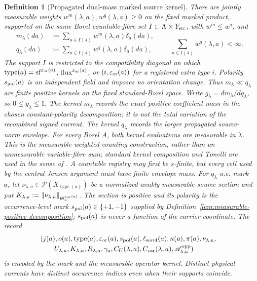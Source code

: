 \documentclass[11pt]{article}
\newtheorem{definition}[theorem]{Definition}
\begin{document}
\begin{definition}[Propagated dual-mass marked source kernel]
There are jointly measurable
weights $w^m(\lambda,a),w^q(\lambda,a)\ge0$ on the fixed marked product,
supported on the same Borel countable-fibre set
$I\subset\Lambda\times Y_{\rm src}$, with $w^m\le w^q$, and
\begin{equation}
\label{eq:marked-weighted-counting-kernel}
 \begin{aligned}
 m_\lambda(da)&:=\sum_{a\in I(\lambda)}w^m(\lambda,a)\delta_a(da),\\
 q_\lambda(da)&:=\sum_{a\in I(\lambda)}w^q(\lambda,a)\delta_a(da),
 \end{aligned}
 \qquad
 \sum_{a\in I(\lambda)}w^q(\lambda,a)<\infty.
\end{equation}
The support $I$ is restricted to the compatibility diagonal on which
$\operatorname{type}(a)=\mathrm{sf}^{\varepsilon_{\rm or}(a)}$,
$\mathrm{flux}^{\varepsilon_{\rm or}(a)}$, or
$(i,\varepsilon_{\rm or}(a))$ for a registered extra type $i$.  Polarity
$s_{\rm pol}(a)$ is an independent field and imposes no orientation change.
Thus $m_\lambda\ll q_\lambda$ are finite positive kernels on the fixed
standard-Borel space.  Write $g_\lambda=dm_\lambda/dq_\lambda$, so
$0\le g_\lambda\le1$.  The kernel $m_\lambda$ records the exact positive
coefficient mass in the chosen constant-polarity decomposition; it is not
the total variation of the recombined signed current.  The kernel
$q_\lambda$ records the larger propagated source-norm envelope.
For every Borel $A$, both kernel evaluations are measurable in $\lambda$.
This is the measurable weighted-counting construction, rather than an
unmeasurable variable-fibre sum; standard kernel composition and Tonelli are
used in the sense of \cite{VakarOng}.  A countable registry may first be
$s$-finite, but every cell used by the central Jensen argument must have
finite envelope mass.  For $q_\lambda$-a.e. mark $a$, let
$\nu_{\lambda,a}\in\mathcal P(X_{\operatorname{type}(a)})$ be a normalized
weakly measurable source section and put
$K_{\lambda,a}:=\|\nu_{\lambda,a}\|_{
\mathfrak S_a^{\varepsilon_{\rm or}(a)}}$.
The section is positive and its polarity is the occurrence-level mark
$s_{\rm pol}(a)\in\{+1,-1\}$ supplied by
Definition~\ref{lem:measurable-positive-decomposition}; $s_{\rm pol}(a)$ is never a
function of the carrier coordinate.
The record
\begin{equation}
\label{eq:source-incidence-record}
\begin{aligned}
 &(j(a),o(a),\operatorname{type}(a),\varepsilon_{\rm or}(a),
   s_{\rm pol}(a),\ell_{\rm word}(a),\kappa(a),\pi(a),\nu_{\lambda,a},\\
 &\qquad U_{\lambda,a},K_{\lambda,a},R_{\lambda,a},\gamma_a,
   C_U(\lambda,a),C_{\rm car}(\lambda,a),
   \mathscr A_{\lambda,a}^{\rm opp})
\end{aligned}
\end{equation}
is encoded by the mark and the measurable operator kernel.  Distinct
physical currents have distinct occurrence indices even when their supports
coincide.


\end{definition}
\end{document}
